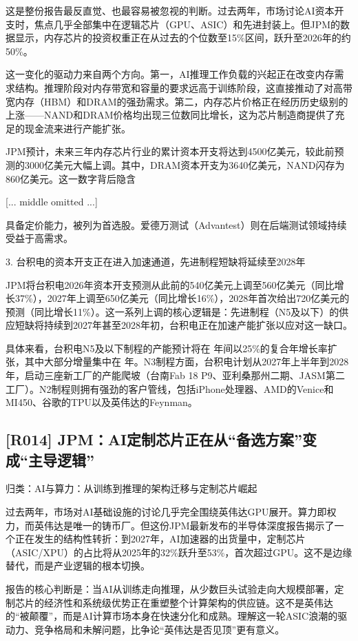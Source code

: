 \documentclass[11pt]{ctexart}
\begin{document}
这是整份报告最反直觉、也最容易被忽视的判断。过去两年，市场讨论AI资本开支时，焦点几乎全部集中在逻辑芯片（GPU、ASIC）和先进封装上。但JPM的数据显示，内存芯片的投资权重正在从过去的个位数至15\%区间，跃升至2026年的约50\%。

这一变化的驱动力来自两个方向。第一，AI推理工作负载的兴起正在改变内存需求结构。推理阶段对内存带宽和容量的要求远高于训练阶段，这直接推动了对高带宽内存（HBM）和DRAM的强劲需求。第二，内存芯片价格正在经历历史级别的上涨——NAND和DRAM价格均出现三位数同比增长，这为芯片制造商提供了充足的现金流来进行产能扩张。

JPM预计，未来三年内存芯片行业的累计资本开支将达到4500亿美元，较此前预测的3000亿美元大幅上调。其中，DRAM资本开支为3640亿美元，NAND闪存为860亿美元。这一数字背后隐含

[... middle omitted ...]

具备定价能力，被列为首选股。爱德万测试（Advantest）则在后端测试领域持续受益于高需求。

3. 台积电的资本开支正在进入加速通道，先进制程短缺将延续至2028年

JPM将台积电2026年资本开支预测从此前的540亿美元上调至560亿美元（同比增长37\%），2027年上调至650亿美元（同比增长16\%），2028年首次给出720亿美元的预测（同比增长11\%）。这一系列上调的核心逻辑是：先进制程（N5及以下）的供应短缺将持续到2027年甚至2028年初，台积电正在加速产能扩张以应对这一缺口。

具体来看，台积电N5及以下制程的产能预计将在 年间以25\%的复合年增长率扩张，其中大部分增量集中在 年。N3制程方面，台积电计划从2027年上半年到2028年，启动三座新工厂的产能爬坡（台南Fab 18 P9、亚利桑那州二期、JASM第二工厂）。N2制程则拥有强劲的客户管线，包括iPhone处理器、AMD的Venice和MI450、谷歌的TPU以及英伟达的Feynman。

\subsection{[R014] JPM：AI定制芯片正在从“备选方案”变成“主导逻辑”}
{\small\color{refgray}归类：AI与算力：从训练到推理的架构迁移与定制芯片崛起}

过去两年，市场对AI基础设施的讨论几乎完全围绕英伟达GPU展开。算力即权力，而英伟达是唯一的铸币厂。但这份JPM最新发布的半导体深度报告揭示了一个正在发生的结构性转折：到2027年，AI加速器的出货量中，定制芯片（ASIC/XPU）的占比将从2025年的32\%跃升至53\%，首次超过GPU。这不是边缘替代，而是产业逻辑的根本切换。

报告的核心判断是：当AI从训练走向推理，从少数巨头试验走向大规模部署，定制芯片的经济性和系统级优势正在重塑整个计算架构的供应链。这不是英伟达的“被颠覆”，而是AI计算市场本身在快速分化和成熟。理解这一轮ASIC浪潮的驱动力、竞争格局和未解问题，比争论“英伟达是否见顶”更有意义。
\end{document}
